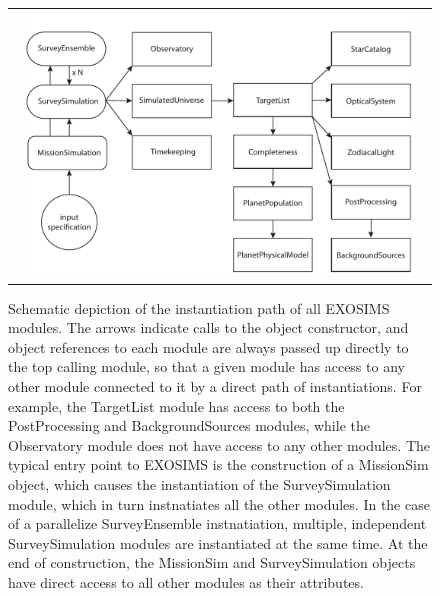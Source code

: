 \documentclass[cleanfoot]{asme2ej}
\begin{document}

\begin{figure}[ht]
    \begin{center}
        \begin{tabular}{c}
             \includegraphics[width=0.95\textwidth]{instantiation_tree2b}
        \end{tabular}
    \end{center}
    \caption{Schematic depiction of the instantiation path of all EXOSIMS modules.  The arrows indicate calls to the object constructor, and object references to each module are always passed up directly to the top calling module, so that a given module has access to any other module connected to it by a direct path of instantiations. For example, the TargetList module has access to both the PostProcessing and BackgroundSources modules, while the Observatory module does not have access to any other modules. The typical entry point to EXOSIMS is the  construction of a MissionSim object, which causes the instantiation of the SurveySimulation module, which in turn instnatiates all the other modules. In the case of a parallelize SurveyEnsemble instnatiation, multiple, independent SurveySimulation modules are instantiated at the same time.  At the end of construction, the MissionSim and SurveySimulation objects have direct access to all other modules as their attributes.}
    \label{fig:instantiation_tree}
\end{figure}
\end{document}
